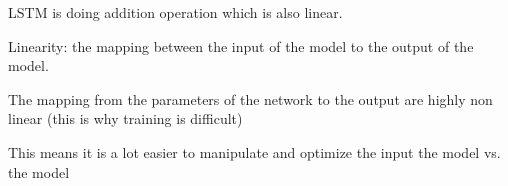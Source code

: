 LSTM is doing addition operation which is also linear. 

Linearity: the mapping between the input of the model to the output of the model.

The mapping from the parameters of the network to the output are highly non linear (this is why training is difficult)

This means it is a lot easier to manipulate and optimize the input the model vs. the model


